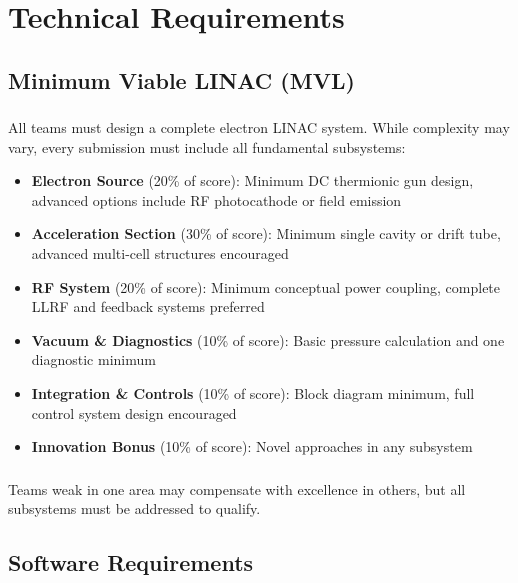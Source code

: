 
\renewcommand{\thesection}{TR}
\section{Technical Requirements}

\subsection{Minimum Viable LINAC (MVL)}

\subsubsection{}
All teams must design a complete electron LINAC system. While complexity may vary, every submission must include all fundamental subsystems:

\begin{itemize}[noitemsep]
    \item \textbf{Electron Source} (20\% of score): Minimum DC thermionic gun design, advanced options include RF photocathode or field emission
    \item \textbf{Acceleration Section} (30\% of score): Minimum single cavity or drift tube, advanced multi-cell structures encouraged
    \item \textbf{RF System} (20\% of score): Minimum conceptual power coupling, complete LLRF and feedback systems preferred
    \item \textbf{Vacuum \& Diagnostics} (10\% of score): Basic pressure calculation and one diagnostic minimum
    \item \textbf{Integration \& Controls} (10\% of score): Block diagram minimum, full control system design encouraged
    \item \textbf{Innovation Bonus} (10\% of score): Novel approaches in any subsystem
\end{itemize}

\subsubsection{}
Teams weak in one area may compensate with excellence in others, but all subsystems must be addressed to qualify.

\subsection{Software Requirements}

